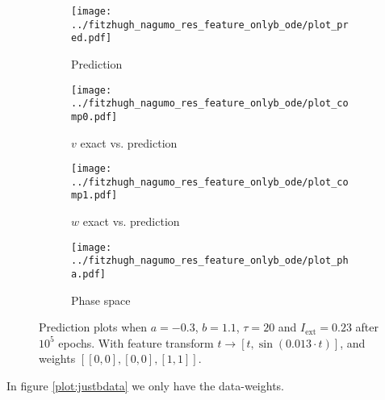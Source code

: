 \documentclass[a4paper]{article}
\begin{document}
\begin{figure}[H]
	\centering 
	\begin{subfigure}[b]{0.47\textwidth}
		\centering
		\texttt{[image: ../fitzhugh\_nagumo\_res\_feature\_onlyb\_ode/plot\_pred.pdf]}
		\caption{Prediction}
		\label{fig:justbodea}
	\end{subfigure}
	\begin{subfigure}[b]{0.47\textwidth}
		\centering
		\texttt{[image: ../fitzhugh\_nagumo\_res\_feature\_onlyb\_ode/plot\_comp0.pdf]}
		\caption{$v$ exact vs. prediction}
		\label{fig:justbodeb}
	\end{subfigure}
	\begin{subfigure}[b]{0.47\textwidth}
		\centering
		\texttt{[image: ../fitzhugh\_nagumo\_res\_feature\_onlyb\_ode/plot\_comp1.pdf]}
		\caption{$w$ exact vs. prediction}
		\label{fig:justbodec}
	\end{subfigure}
	\begin{subfigure}[b]{0.47\textwidth}
		\centering
		\texttt{[image: ../fitzhugh\_nagumo\_res\_feature\_onlyb\_ode/plot\_pha.pdf]}
		\caption{Phase space}
		\label{fig:justboded}
	\end{subfigure}
	\caption{Prediction plots when $a=-0.3$, $b=1.1$, $\tau=20$ and $ I_{\text{ext}}=0.23$ after $10^5$ epochs. With feature transform $t \rightarrow \left[ t, \sin(0.013\cdot t) \right] $, and weights $\left[ \left[ 0, 0\right], \left[ 0, 0\right], \left[ 1, 1\right]\right]$.}
	\label{plot:justbode}
\end{figure} 	


In figure \ref{plot:justbdata} we only have the data-weights. 
\end{document}
